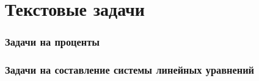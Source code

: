 \part{Текстовые задачи}
\section{Задачи на проценты}
\section{Задачи на составление системы линейных уравнений}
